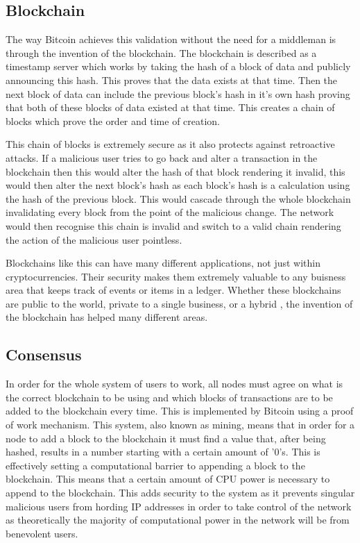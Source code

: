 \documentclass{l4proj}
\begin{document}
\subsection{Blockchain}
The way Bitcoin achieves this validation without the need for a middleman is through the invention of the blockchain.
The blockchain is described as a timestamp server which works by taking the hash of a block of data and publicly
announcing this hash. This proves that the data exists at that time. Then the next block of data can include the
previous block's hash in it's own hash proving that both of these blocks of data existed at that time. This creates 
a chain of blocks which prove the order and time of creation.

This chain of blocks is extremely secure as it also protects against retroactive attacks. If a malicious user tries
to go back and alter a transaction in the blockchain then this would alter the hash of that block rendering it invalid,
this would then alter the next block's hash as each block's hash is a calculation using the hash of the previous block.
This would cascade through the whole blockchain invalidating every block from the point of the malicious change. The 
network would then recognise this chain is invalid and switch to a valid chain rendering the action of the malicious
user pointless.

Blockchains like this can have many different applications, not just within cryptocurrencies. Their security makes them
extremely valuable to any buisness area that keeps track of events or items in a ledger. Whether these blockchains are
public to the world, private to a single business, or a hybrid \citep{pilkington2016blockchain}, the invention of the blockchain has helped many different areas.

\subsection{Consensus}
In order for the whole system of users to work, all nodes must agree on what is the correct blockchain to be using and
which blocks of transactions are to be added to the blockchain every time. This is implemented by Bitcoin using a proof of
work mechanism. This system, also known as mining, means that in order for a node to add a block to the blockchain it
must find a value that, after being hashed, results in a number starting with a certain amount of '0's. This is 
effectively setting a computational barrier to appending a block to the blockchain. This means that a certain amount of
CPU power is necessary to append to the blockchain. This adds security to the system as it prevents singular malicious
users from hording IP addresses in order to take control of the network as theoretically the majority of computational
power in the network will be from benevolent users.
\end{document}
